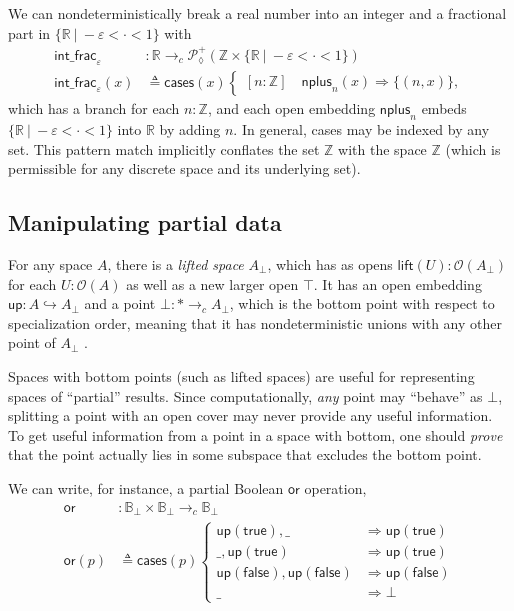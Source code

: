 \documentclass[conference]{IEEEtran}
\newcommand{\PLower}{\mathcal{P}_\lozenge}
\newcommand{\hookto}{\hookrightarrow}
\newcommand{\cto}{\to_c}
\newcommand{\R}{\mathbb{R}}
\newcommand{\Z}{\mathbb{Z}}
\newcommand{\suchthat}{\ |\ }
\newcommand{\One}{\ast}
\newcommand{\Open}[1]{\mathcal{O}({#1})}
\newcommand{\bool}{\mathbb{B}}
\newcommand{\wildcard}{\_}
\newcommand{\Branch}{\Rightarrow}
\newcommand{\up}{\mathsf{up}}
\newcommand{\btrue}{\mathsf{true}}
\newcommand{\bfalse}{\mathsf{false}}
\begin{document}
We can nondeterministically break a real number into an integer and a fractional part in $\{ \R \suchthat -\varepsilon < \cdot < 1 \}$ with
\begin{align*}
\mathsf{int\_frac}_\varepsilon &: \R \cto \PLower^+(\Z \times \{ \R \suchthat -\varepsilon < \cdot < 1 \})
\\ \mathsf{int\_frac}_\varepsilon(x) &\triangleq \mathsf{cases}(x)
\begin{cases}
[n : \Z] \quad \mathsf{nplus}_n(x) \Branch \{ (n, x) \},
\end{cases}
\end{align*}
which has a branch for each $n : \Z$, and each open embedding $\mathsf{nplus}_n$ embeds $\{ \R \suchthat -\varepsilon < \cdot < 1 \}$ into $\R$ by adding $n$. In general, cases may be indexed by any set. This pattern match implicitly conflates the set $\Z$ with the space $\Z$ (which is permissible for any discrete space and its underlying set).

\subsection{Manipulating partial data}
\label{s:ex:partial}

For any space $A$, there is a \emph{lifted space} $A_\bot$, which has as opens $\mathsf{lift}(U) : \Open{A_\bot}$ for each $U : \Open{A}$ as well as a new larger open $\top$. It has an open embedding $ \up : A \hookto A_\bot$ and a point $\bot : \One \cto A_\bot$, which is the bottom point with respect to specialization order, meaning that it has nondeterministic unions with any other point of $A_\bot$ \cite{topologyvialogic}.

Spaces with bottom points (such as lifted spaces) are useful for representing spaces of ``partial'' results. Since computationally, \emph{any} point may ``behave'' as $\bot$, splitting a point with an open cover may never provide any useful information. To get useful information from a point in a space with bottom, one should \emph{prove} that the point actually lies in some subspace that excludes the bottom point.

We can write, for instance, a partial Boolean $\mathsf{or}$ operation,
\begin{align*}
\mathsf{or} &: \bool_\bot \times \bool_\bot \cto \bool_\bot
\\ \mathsf{or}(p) &\triangleq \mathsf{cases}(p)
\begin{cases}
\up(\btrue), \wildcard &\Branch \up(\btrue)
\\ \wildcard, \up(\btrue) &\Branch \up(\btrue)
\\ \up(\bfalse), \up(\bfalse) &\Branch \up(\bfalse)
\\ \wildcard &\Branch \bot
\end{cases}
\end{align*}
\end{document}
